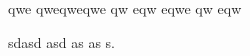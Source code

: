 \documentclass{book}
\begin{document}
\tableofcontents{}
\Blinddocument{}

qwe
qweqweqwe qw eqw eqwe qw eqw \cite{b1}

\begin{thebibliography}{9}
 sdasd asd as as s.
\end{thebibliography}
\end{document}

